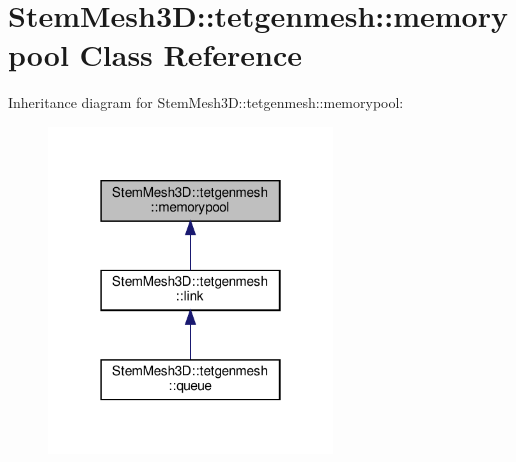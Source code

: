 \hypertarget{classStemMesh3D_1_1tetgenmesh_1_1memorypool}{}\section{Stem\+Mesh3D\+:\+:tetgenmesh\+:\+:memorypool Class Reference}
\label{classStemMesh3D_1_1tetgenmesh_1_1memorypool}


Inheritance diagram for Stem\+Mesh3D\+:\+:tetgenmesh\+:\+:memorypool\+:\nopagebreak
\begin{figure}[H]
\begin{center}
\leavevmode
\includegraphics[width=214pt]{classStemMesh3D_1_1tetgenmesh_1_1memorypool__inherit__graph}
\end{center}
\end{figure}
